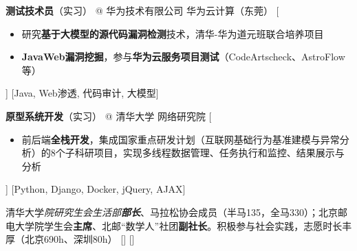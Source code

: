 \documentclass[zh]{resume}
\begin{document}
\begin{experiences}
    {\textbf{测试技术员}（实习） @ 华为技术有限公司 \textbullet 华为云计算（东莞）}%
    [\begin{itemize}
      \item 研究\textbf{基于大模型的源代码漏洞检测}技术，清华-华为道元班联合培养项目
      \item \textbf{JavaWeb漏洞挖掘}，参与\textbf{华为云服务项目测试}（CodeArtscheck、AstroFlow等）
    \end{itemize}]
    [Java, Web渗透, 代码审计, 大模型]

  \separator{0.5ex}
    {\textbf{原型系统开发}（实习） @ 清华大学 \textbullet 网络研究院}%
    [\begin{itemize}
      \item 前后端\textbf{全栈开发}，集成国家重点研发计划（互联网基础行为基准建模与异常分析）的8个子科研项目，实现多线程数据管理、任务执行和监控、结果展示与分析
    \end{itemize}]
    [Python, Django, Docker, jQuery, AJAX]
    
  \separator{0.5ex}
    {清华大学\textit{院研究生会生活部\textbf{部长}}、马拉松协会成员（半马135，全马330）；北京邮电大学院学生会\textbf{主席}、北邮“数学人”社团\textbf{副社长}。积极参与社会实践，志愿时长丰厚（北京690h、深圳80h）}%
    []
    []
\end{experiences}
\end{document}
